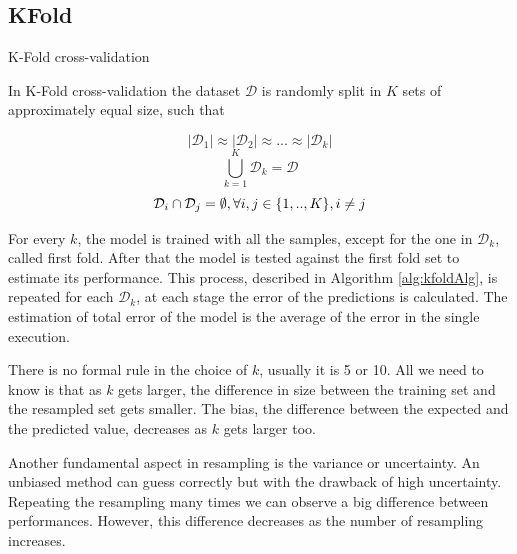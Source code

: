 \subsection{KFold}

\begin{algorithm}
	\caption{K-Fold cross-validation}\label{alg:kfoldAlg}
	\begin{algorithmic}[1]
		 
		
		
		\EndFor
		
	\end{algorithmic}
\end{algorithm}

In K-Fold cross-validation the dataset $\mathcal{D}$ is randomly split in $K$ sets of approximately equal size, such that \cite{ghojogh2019theory} \cite{kuhn2013applied}

\[|\mathcal{D}_1| \approx |\mathcal{D}_2| \approx ... \approx |\mathcal{D}_k|
\]
\[
\bigcup_{k=1}^{K} \mathcal{D}_{k} = \mathcal{D}
\]
\[
 \mathcal{D}_i \cap \mathcal{D}_j = \emptyset, \space \forall i,j \in \{1, .., K \}, i \neq j
\]

For every $k$, the model is trained with all the samples, except for the one in $\mathcal{D}_k$, called first fold. After that the model is tested against the first fold set to estimate its performance. This process, described in Algorithm \ref{alg:kfoldAlg}, is repeated for each $\mathcal{D}_k$, at each stage the error of the predictions is calculated. The estimation of total error of the model is the average of the error in the single execution.

There is no formal rule in the choice of $k$, usually it is 5 or 10. All we need to know is that as $k$ gets larger, the difference in size between the training set and the resampled set gets smaller. The bias, the difference between the expected and the predicted value, decreases as $k$ gets larger too.

Another fundamental aspect in resampling is the variance or uncertainty. An unbiased method can guess correctly but with the drawback of high uncertainty. Repeating the resampling many times we can observe a big difference between performances. However, this difference decreases as the number of resampling increases.

